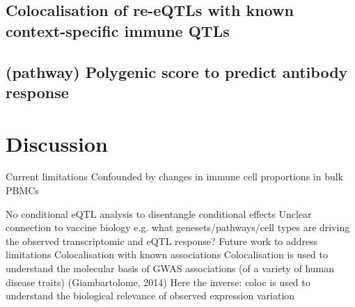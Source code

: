 \subsection{Colocalisation of re-eQTLs with known context-specific immune QTLs}


\subsection{(pathway) Polygenic score to predict antibody response}

\section{Discussion}

Current limitations
Confounded by changes in immune cell proportions in bulk PBMCs

No conditional eQTL analysis to disentangle conditional effects
Unclear connection to vaccine biology e.g. what genesets/pathways/cell types are driving the observed transcriptomic and eQTL response?
Future work to address limitations
Colocalisation with known associations
Colocalisation is used to understand the molecular basis of GWAS associations (of a variety of human disease traits) (Giambartolome, 2014)
Here the inverse: coloc is used to understand the biological relevance of observed expression variation

